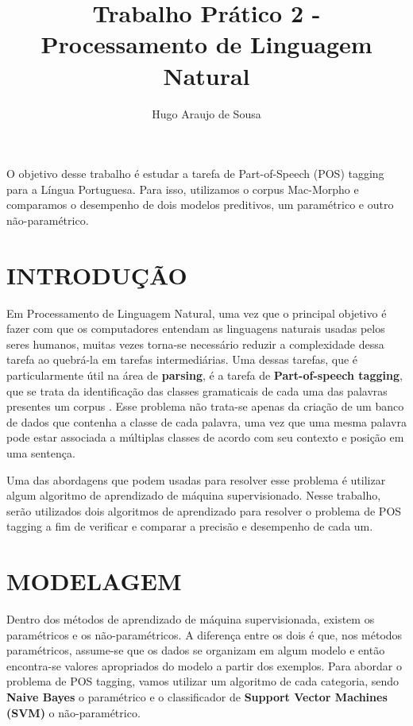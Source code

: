 \documentclass[12pt]{article}
\title{Trabalho Prático 2 - Processamento de Linguagem Natural}
\author{Hugo Araujo de Sousa}
\begin{document}
 

\maketitle
     
\begin{resumo} 
  O objetivo desse trabalho é estudar a tarefa de Part-of-Speech (POS) tagging
  para a Língua Portuguesa. Para isso, utilizamos o corpus Mac-Morpho e comparamos
  o desempenho de dois modelos preditivos, um paramétrico e outro não-paramétrico.
\end{resumo}

\section{INTRODUÇÃO}

Em Processamento de Linguagem Natural, uma vez que o principal objetivo é fazer
com que os computadores entendam as linguagens naturais usadas pelos seres
humanos, muitas vezes torna-se necessário reduzir a complexidade dessa tarefa
ao quebrá-la em tarefas intermediárias. Uma dessas tarefas, que é particularmente
útil na área de \textbf{parsing}, é a tarefa de \textbf{Part-of-speech tagging},
que se trata da identificação das classes gramaticais de cada uma das palavras
presentes um corpus \cite{Manning:1999:FSN:311445}. Esse problema não trata-se
apenas da criação de um banco de dados que contenha a classe de cada palavra,
uma vez que uma mesma palavra pode estar associada a múltiplas classes de acordo
com seu contexto e posição em uma sentença.

Uma das abordagens que podem usadas para resolver esse problema é utilizar algum
algoritmo de aprendizado de máquina supervisionado. Nesse trabalho, serão
utilizados dois algoritmos de aprendizado para resolver o problema de POS
tagging a fim de verificar e comparar a precisão e desempenho de cada um.

\section{MODELAGEM}

Dentro dos métodos de aprendizado de máquina supervisionada, existem os 
paramétricos e os não-paramétricos. A diferença entre os dois é que, nos métodos
paramétricos, assume-se que os dados se organizam em algum modelo e então encontra-se
valores apropriados do modelo a partir dos exemplos. Para abordar o problema
de POS tagging, vamos utilizar um algoritmo de cada categoria, sendo
\textbf{Naive Bayes} \cite{McCallum98acomparison} o paramétrico e o classificador
 de \textbf{Support Vector Machines (SVM)} \cite{708428} o não-paramétrico.
\end{document}
